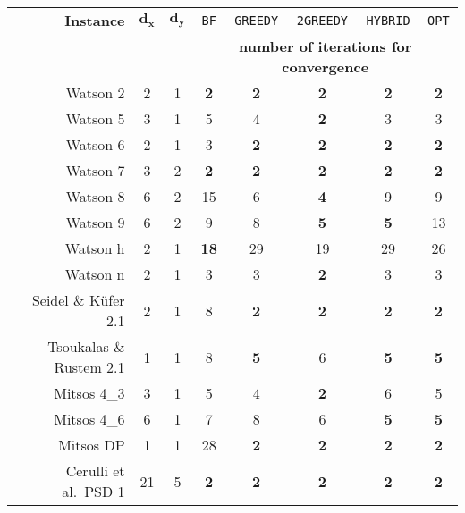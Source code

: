 \documentclass{article}
\newcommand{\1}[1]{\mathds{1}\left[#1\right]}
\begin{document}
\begin{table}[t]
\centering
\begin{tabular}{rccccccc}
\hline
\textbf{Instance}     & $\mathbf{d_x}$ & $\mathbf{d_y}$ & \texttt{BF}            & \texttt{GREEDY}        & \texttt{2GREEDY}       & \texttt{HYBRID}    & \texttt{OPT}   \\
            &    &    &  \multicolumn{5}{c}{\textbf{number of iterations for convergence}} \\ \hline
Watson 2    & 2 & 1  & \textbf{2}                 & \textbf{2}            & \textbf{2}           & \textbf{2}             & \textbf{2}  \\
Watson 5    & 3  & 1  & 5            & 4            & \textbf{2}           & 3             & 3 \\
Watson 6    & 2  & 1  & 3             & \textbf{2}            & \textbf{2}           & \textbf{2}             & \textbf{2}  \\
Watson 7    & 3 & 2  & \textbf{2}                 & \textbf{2}            & \textbf{2}           & \textbf{2}             & \textbf{2}  \\
Watson 8    & 6  & 2  & 15            & 6            & \textbf{4}           & 9            & 9 \\
Watson 9    & 6  & 2  & 9            & 8   & \textbf{5}           & \textbf{5}          &   13 \\
Watson h    & 2  & 1  & \textbf{18}            & 29       & 19           & 29      &   26     \\
Watson n    & 2  & 1  & 3             & 3            & \textbf{2}           & 3 & 3             \\
Seidel \& K{\"u}fer 2.1      & 2  & 1  & 8            & \textbf{2}            & \textbf{2}           & \textbf{2}  & \textbf{2}             \\
Tsoukalas \& Rustem 2.1        & 1  & 1  & 8            & \textbf{5}            & 6           & \textbf{5}            & \textbf{5}   \\
Mitsos 4\_3 & 3  & 1  & 5            & 4            & \textbf{2}           & 6           & 5   \\
Mitsos 4\_6 & 6  & 1  & 7            & 8           & 6           & \textbf{5}             & \textbf{5}  \\
Mitsos DP   & 1  & 1  & 28            & \textbf{2}             & \textbf{2}            & \textbf{2}    & \textbf{2}              \\
Cerulli et al.\ PSD 1 &	21 &	5 &	\textbf{2} &	\textbf{2} &	\textbf{2} &	\textbf{2} &	\textbf{2} \\

\end{tabular}
\end{table}
\end{document}
